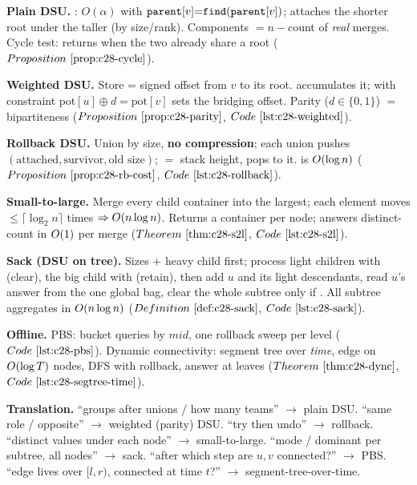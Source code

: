 \begin{quickref}
\textbf{Plain DSU.} : \(O(\alpha)\) with
\(\texttt{parent}[v]{=}\texttt{find}(\texttt{parent}[v])\);  attaches the
shorter root under the taller (by size/rank). Components \(=n-\)count of
\emph{real} merges. Cycle test:  returns  when the two
already share a root (\(\propref{c28-cycle}\)).

\medskip
\textbf{Weighted DSU.} Store  = signed offset from \(v\) to its
root.  accumulates it;  with constraint
\(\text{pot}[u]\oplus d = \text{pot}[v]\) sets the bridging offset. Parity
(\(d\in\{0,1\}\)) \(=\) bipartiteness (\(\propref{c28-parity}\),
\(\coderef{c28-weighted}\)).

\medskip
\textbf{Rollback DSU.} Union by size, \textbf{no compression}; each union pushes
\((\text{attached},\text{survivor},\text{old size})\);  \(=\)
stack height,  pops to it.  is
\(O(\log n)\) (\(\propref{c28-rb-cost}\), \(\coderef{c28-rollback}\)).

\medskip
\textbf{Small-to-large.} Merge every child container into the largest; each
element moves \(\le\lceil\log_2 n\rceil\) times \(\Rightarrow O(n\log n)\).
Returns a container per node; answers distinct-count in \(O(1)\) per merge
(\(\thmref{c28-s2l}\), \(\coderef{c28-s2l}\)).

\medskip
\textbf{Sack (DSU on tree).} Sizes + heavy child first; process light children
with  (clear), the big child with  (retain),
then add \(u\) and its light descendants, read \(u\)'s answer from the one
global bag, clear the whole subtree only if . All subtree
aggregates in \(O(n\log n)\) (\(\defref{c28-sack}\), \(\coderef{c28-sack}\)).

\medskip
\textbf{Offline.} PBS: bucket queries by \(\mathit{mid}\), one rollback sweep
per level (\(\coderef{c28-pbs}\)). Dynamic connectivity: segment tree over
\emph{time}, edge on \(O(\log T)\) nodes, DFS with rollback, answer at
leaves (\(\thmref{c28-dync}\), \(\coderef{c28-segtree-time}\)).

\medskip
\textbf{Translation.} ``groups after unions / how many teams'' \(\to\) plain DSU.
``same role / opposite'' \(\to\) weighted (parity) DSU. ``try then undo''
\(\to\) rollback. ``distinct values under each node'' \(\to\) small-to-large.
``mode / dominant per subtree, all nodes'' \(\to\) sack. ``after which step are
\(u,v\) connected?'' \(\to\) PBS. ``edge lives over \([l,r)\), connected at time
\(t\)?'' \(\to\) segment-tree-over-time.
\end{quickref}

